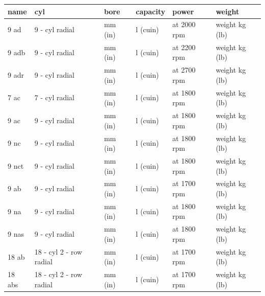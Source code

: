 \documentclass{article}
\begin{document}
\begin{tabular}{llllll}
\toprule
name & cyl & bore & capacity & power & weight \\
\midrule
9 ad & 9 - cyl radial & mm (in) & l (cuin) & at 2000 rpm & weight kg (lb) \\
9 adb & 9 - cyl radial & mm (in) & l (cuin) & at 2200 rpm & weight kg (lb) \\
9 adr & 9 - cyl radial & mm (in) & l (cuin) & at 2700 rpm & weight kg (lb) \\
7 ac & 7 - cyl radial & mm (in) & l (cuin) & at 1800 rpm & weight kg (lb) \\
9 ac & 9 - cyl radial & mm (in) & l (cuin) & at 1800 rpm & weight kg (lb) \\
9 nc & 9 - cyl radial & mm (in) & l (cuin) & at 1800 rpm & weight kg (lb) \\
9 nct & 9 - cyl radial & mm (in) & l (cuin) & at 1800 rpm & weight kg (lb) \\
9 ab & 9 - cyl radial & mm (in) & l (cuin) & at 1700 rpm & weight kg (lb) \\
9 na & 9 - cyl radial & mm (in) & l (cuin) & at 1800 rpm & weight kg (lb) \\
9 nas & 9 - cyl radial & mm (in) & l (cuin) & at 1800 rpm & weight kg (lb) \\
18 ab & 18 - cyl 2 - row radial & mm (in) & l (cuin) & at 1700 rpm & weight kg (lb) \\
18 abs & 18 - cyl 2 - row radial & mm (in) & l (cuin) & at 1700 rpm & weight kg (lb) \\
\bottomrule
\end{tabular}
\end{document}
